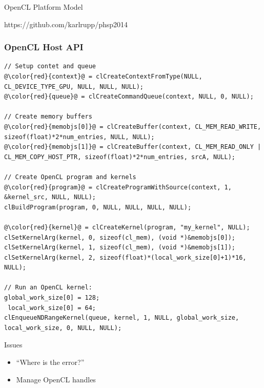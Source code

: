 \begin{frame}{OpenCL Platform Model}
 \begin{center}
   \Huge https://github.com/karlrupp/phsp2014
 \end{center}
\end{frame}





\begin{frame}[fragile]
\frametitle{OpenCL Host API}

\lstset{ basicstyle=\scriptsize\ttfamily }
\begin{lstlisting}[escapechar=@]
// Setup contet and queue
@\color{red}{context}@ = clCreateContextFromType(NULL, CL_DEVICE_TYPE_GPU, NULL, NULL, NULL);
@\color{red}{queue}@ = clCreateCommandQueue(context, NULL, 0, NULL);

// Create memory buffers
@\color{red}{memobjs[0]}@ = clCreateBuffer(context, CL_MEM_READ_WRITE, sizeof(float)*2*num_entries, NULL, NULL);
@\color{red}{memobjs[1]}@ = clCreateBuffer(context, CL_MEM_READ_ONLY | CL_MEM_COPY_HOST_PTR, sizeof(float)*2*num_entries, srcA, NULL);

// Create OpenCL program and kernels
@\color{red}{program}@ = clCreateProgramWithSource(context, 1, &kernel_src, NULL, NULL);
clBuildProgram(program, 0, NULL, NULL, NULL, NULL);
 
@\color{red}{kernel}@ = clCreateKernel(program, "my_kernel", NULL);
clSetKernelArg(kernel, 0, sizeof(cl_mem), (void *)&memobjs[0]);
clSetKernelArg(kernel, 1, sizeof(cl_mem), (void *)&memobjs[1]);
clSetKernelArg(kernel, 2, sizeof(float)*(local_work_size[0]+1)*16, NULL);
 
// Run an OpenCL kernel:
global_work_size[0] = 128;
 local_work_size[0] = 64;
clEnqueueNDRangeKernel(queue, kernel, 1, NULL, global_work_size, local_work_size, 0, NULL, NULL);
\end{lstlisting}
\lstset{ basicstyle=\small\ttfamily }

\begin{block}{Issues}
 \begin{itemize}
  \item ``Where is the error?''
  \item Manage OpenCL handles
 \end{itemize}

\end{block}

\end{frame}
